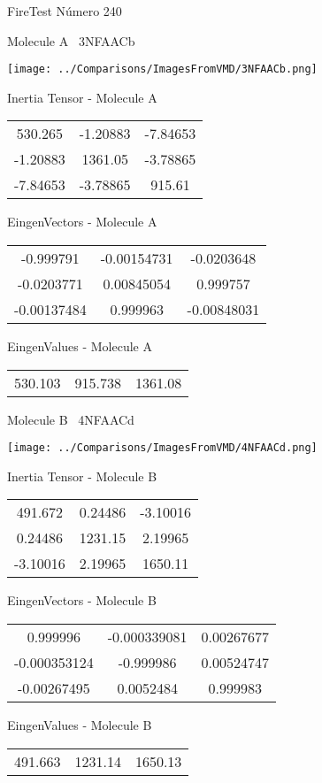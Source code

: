 \vtab[-3cm]
\begin{center}
{\large FireTest \tab Número 240}
\end{center}
\begin{multicols}{2}
\begin{center}

Molecule A \
3NFAACb

\texttt{[image: ../Comparisons/ImagesFromVMD/3NFAACb.png]}

Inertia Tensor - Molecule A \\
\begin{tabular}{|c c c|}
530.265	 & 	-1.20883	 & 	-7.84653	 \\
-1.20883	 & 	1361.05	 & 	-3.78865	 \\
-7.84653	 & 	-3.78865	 & 	915.61
\end{tabular}

\vtab
 EingenVectors - Molecule A     \\
\begin{tabular}{|c c c|}
-0.999791	 & 	-0.00154731	 & 	-0.0203648	 \\
-0.0203771	 & 	0.00845054	 & 	0.999757	 \\
-0.00137484	 & 	0.999963	 & 	-0.00848031
\end{tabular}

\vtab
 EingenValues - Molecule A     \\
\begin{tabular}{|c c c|}
530.103	 & 	915.738	 & 	1361.08	 \\
\end{tabular}
\columnbreak

Molecule B \
4NFAACd

\texttt{[image: ../Comparisons/ImagesFromVMD/4NFAACd.png]}

Inertia Tensor - Molecule B \\
\begin{tabular}{|c c c|}
491.672	 & 	0.24486	 & 	-3.10016	 \\
0.24486	 & 	1231.15	 & 	2.19965	 \\
-3.10016	 & 	2.19965	 & 	1650.11
\end{tabular}

\vtab
 EingenVectors - Molecule B     \\
\begin{tabular}{|c c c|}
0.999996	 & 	-0.000339081	 & 	0.00267677	 \\
-0.000353124	 & 	-0.999986	 & 	0.00524747	 \\
-0.00267495	 & 	0.0052484	 & 	0.999983
\end{tabular}

\vtab
 EingenValues - Molecule B     \\
\begin{tabular}{|c c c|}
491.663	 & 	1231.14	 & 	1650.13	 \\
\end{tabular}

\end{center}
\end{multicols}

